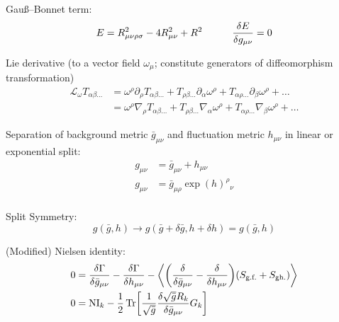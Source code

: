 		\noindent
		Gauß--Bonnet term:
		\begin{equation}
			E = R_{\mu\nu\rho\sigma}^2 - 4 R_{\mu\nu}^2 + R^2
			\hsp \fdv{E}{g_{\mu\nu}} = 0
		\end{equation}

		\noindent
		Lie derivative (\wrt to a vector field $\omega_\mu$; constitute generators of diffeomorphism transformation)
		\begin{equation}
			\begin{aligned}
				\mathcal{L}_\omega T_{\alpha\beta\dots} 
				&= \omega^\rho \partial_\rho T_{\alpha\beta\dots} + T_{\rho\beta\dots} \partial_\alpha \omega^\rho + T_{\alpha\rho\dots} \partial_\beta \omega^\rho + \dots \\
				&= \omega^\rho \nabla_\rho T_{\alpha\beta\dots} + T_{\rho\beta\dots} \nabla_\alpha \omega^\rho + T_{\alpha\rho\dots} \nabla_\beta \omega^\rho + \dots
			\end{aligned}
		\end{equation}

		\noindent
		Separation of background metric $\bar{g}_{\mu\nu}$ and fluctuation metric $h_{\mu\nu}$ in linear or exponential split:
		\begin{align}
			g_{\mu\nu} &= \bar{g}_{\mu\nu} + h_{\mu\nu} \\
			g_{\mu\nu} &= \bar{g}_{\mu\rho}\exp(h)^\rho{}_{\nu} \\
		\end{align}

		\noindent
		Split Symmetry:
		\begin{equation}
			g(\bar{g},h) \to g(\bar{g}+\delta \bar{g}, h + \delta h) = g(\bar{g},h)
		\end{equation}

		\noindent
		(Modified) Nielsen identity:
		\begin{align}
			0 &= \fdv{\Gamma}{\bar{g}_{\mu\nu}} - \fdv{\Gamma}{h_{\mu\nu}} - \Avg{\qty(\fdv{\bar{g}_{\mu\nu}} - \fdv{h_{\mu\nu}})(S_\text{g.f.} + S_\text{gh.})} \\
			0 &= \mathrm{NI}_k - \frac{1}{2} \tr[\frac{1}{\sqrt{\bar{g}}} \fdv{\sqrt{\bar{g}}R_k}{\bar{g}_{\mu\nu}}G_k]
		\end{align}